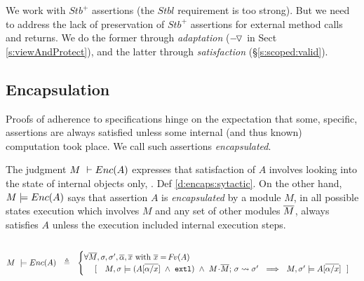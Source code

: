 {We work with  $Stb^+$  assertions   (the  $Stbl$ requirement is too strong). 
But  we need to address the lack of preservation of $Stb^+$ assertions  {for external method calls and returns}.
We do the former   through    \emph{adaptation}   ($ {-\!\,\!{\triangledown}} {}$ in Sect \ref{s:viewAndProtect}), and the latter through  
\emph{\scoped satisfaction} (\S \ref{s:scoped:valid}).
  }
  

\subsection{Encapsulation} %
\label{s:preserve:encaps}
 
Proofs of adherence to specifications  hinge on the expectation that some,  specific, assertions are always satisfied unless some internal (and thus known) computation took place. 
{We call such assertions   \emph{encapsulated}.}
 

The judgment $M\ \vdash {\ensuremath Enc( A )}$  expresses that satisfaction of $A$ involves looking into the state of  
internal objects only,  \cf. Def \ref{d:encaps:sytactic}.
{On the other hand, $M  \models {\ensuremath Enc( A )}$ says that assertion $A$  is  \emph{encapsulated} by a module $M$, \ie in all possible states %
execution which involves $M$ and any set of other modules $\overline{M}$, always satisfies  $A$  unless the execution  included internal execution steps}.
 

\begin{definition} $~$ 
\label{d:encaps}

$ %
    M\ \models \encaps{A}\ \   \triangleq  \ \   
    \begin{cases}
     \forall \Mtwo, \sigma, \sigma',  \overline{\alpha}, \overline{x} \mbox{ with } \overline{x}=\fv(A)\\ %
   \ \ \ \  [\ \ \  \satisfiesA{M}{\sigma}{({A[{\overline {\alpha/x}}]} \ \wedge\ \externalexec)}\  \wedge\ { \leadstoBounded {M\madd\Mtwo}  {\sigma}{\sigma'}} %
   \ \ \Longrightarrow\ \ 
   {M},{\sigma'}\models{A[{\overline {\alpha/x}}]} \ \  ]
    \end{cases}
 $%
  \end{definition}
  
